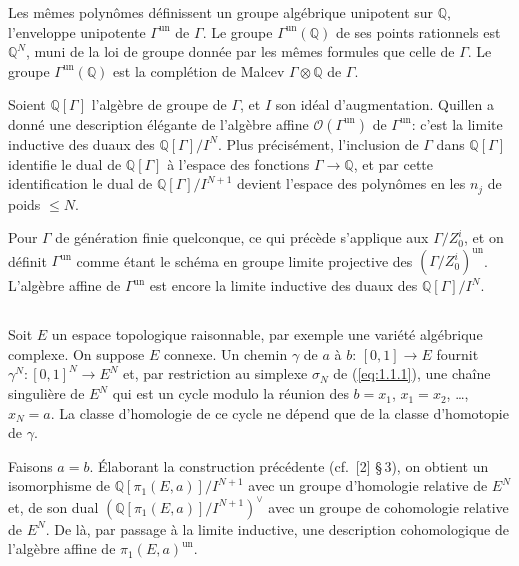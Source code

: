\documentclass[11pt,a4paper]{article}
\theoremstyle{plain}
\theoremstyle{definition}
\newcommand{\Q}{\mathbb{Q}}
\begin{document}
Les m\^emes polyn\^omes d\'efinissent un groupe alg\'ebrique unipotent sur $\Q$, l'enveloppe unipotente $\Gamma^{\mathrm{un}}$ de $\Gamma$. Le groupe $\Gamma^{\mathrm{un}}(\Q)$ de ses points rationnels est $\Q^N$, muni de la loi de groupe donn\'ee par les m\^emes formules que celle de $\Gamma$. Le groupe $\Gamma^{\mathrm{un}}(\Q)$ est la compl\'etion de Malcev $\Gamma \otimes \Q$ de $\Gamma$.

Soient $\Q[\Gamma]$ l'alg\`ebre de groupe de $\Gamma$, et $I$ son id\'eal d'augmentation. Quillen a donn\'e une description \'el\'egante de l'alg\`ebre affine $\mathcal{O}(\Gamma^{\mathrm{un}})$ de $\Gamma^{\mathrm{un}}$: c'est la limite inductive des duaux des $\Q[\Gamma]/I^N$. Plus pr\'ecis\'ement, l'inclusion de $\Gamma$ dans $\Q[\Gamma]$ identifie le dual de $\Q[\Gamma]$ \`a l'espace des fonctions $\Gamma \to \Q$, et par cette identification le dual de $\Q[\Gamma]/I^{N+1}$ devient l'espace des polyn\^omes en les $n_j$ de poids $\leq N$.

Pour $\Gamma$ de g\'en\'eration finie quelconque, ce qui pr\'ec\`ede s'applique aux $\Gamma/Z^i_0$, et on d\'efinit $\Gamma^{\mathrm{un}}$ comme \'etant le sch\'ema en groupe limite projective des $(\Gamma/Z^i_0)^{\mathrm{un}}$. L'alg\`ebre affine de $\Gamma^{\mathrm{un}}$ est encore la limite inductive des duaux des $\Q[\Gamma]/I^N$.

\subsection{}\label{ssec:2.2}

Soit $E$ un espace topologique raisonnable, par exemple une vari\'et\'e alg\'ebrique complexe. On suppose $E$ connexe. Un chemin $\gamma$ de $a$ \`a $b$: $[0,1] \to E$ fournit $\gamma^N: [0,1]^N \to E^N$ et, par restriction au simplexe $\sigma_N$ de (\ref{eq:1.1.1}), une cha\^ine singuli\`ere de $E^N$ qui est un cycle modulo la r\'eunion des $b = x_1$, $x_1 = x_2$, \ldots, $x_N = a$. La classe d'homologie de ce cycle ne d\'epend que de la classe d'homotopie de $\gamma$.

Faisons $a = b$. \'Elaborant la construction pr\'ec\'edente (cf.~[2] \S\,3), on obtient un isomorphisme de $\Q[\pi_1(E,a)]/I^{N+1}$ avec un groupe d'homologie relative de $E^N$ et, de son dual $(\Q[\pi_1(E,a)]/I^{N+1})^\vee$ avec un groupe de cohomologie relative de $E^N$. De l\`a, par passage \`a la limite inductive, une description cohomologique de l'alg\`ebre affine de $\pi_1(E,a)^{\mathrm{un}}$.
\end{document}
